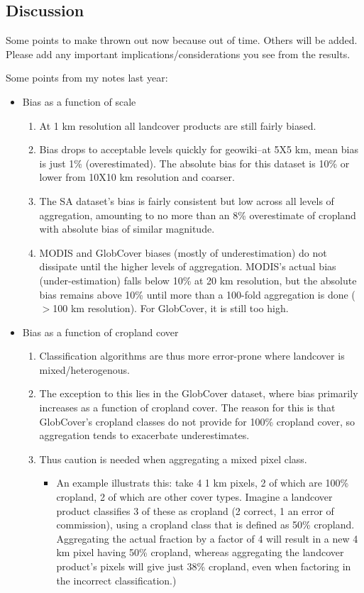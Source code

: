 \documentclass{pnastwo}
\begin{document}
\begin{article}
\section{Discussion}

Some points to make thrown out now because out of time. Others will be added. Please add any important implications/considerations you see from the results.  

Some points from my notes last year: 
\begin{itemize}
  \item Bias as a function of scale
    \begin{enumerate}
      \item At 1 km resolution all landcover products are still fairly biased.  
       \item Bias drops to acceptable levels quickly for geowiki--at 5X5 km, mean bias is just 1\% (overestimated). The absolute bias for this dataset is 10\% or lower from 10X10 km resolution and coarser.  
       \item The SA dataset's bias is fairly consistent but low across all levels of aggregation, amounting to no more than an 8\% overestimate of cropland with absolute bias of similar magnitude. 
       \item MODIS and GlobCover biases (mostly of underestimation) do not dissipate until the higher levels of aggregation. MODIS's actual bias (under-estimation) falls below 10\% at 20 km resolution, but the absolute bias remains above 10\% until more than a 100-fold aggregation is done ($>$100 km resolution).  For GlobCover, it is still too high.  
    \end{enumerate}
  \item Bias as a function of cropland cover
    \begin{enumerate}
      \item Classification algorithms are thus more error-prone where landcover is mixed/heterogenous.
      \item The exception to this lies in the GlobCover dataset, where bias primarily increases as a function of cropland cover. The reason for this is that GlobCover's cropland classes do not provide for 100\% cropland cover, so aggregation tends to exacerbate underestimates. 
      \item Thus caution is needed when aggregating a mixed pixel class.  
        \begin{itemize} 
          \item An example illustrats this: take 4 1 km pixels, 2 of which are 100\% cropland, 2 of which are other cover types. Imagine a landcover product classifies 3 of these as cropland (2 correct, 1 an error of commission), using a cropland class that is defined as 50\% cropland. Aggregating the actual fraction by a factor of 4 will result in a new 4 km pixel having 50\% cropland, whereas aggregating the landcover product's pixels will give just 38\% cropland, even when factoring in the incorrect classification.)

\end{itemize}
\end{enumerate}
\end{itemize}
\end{article}
\end{document}
